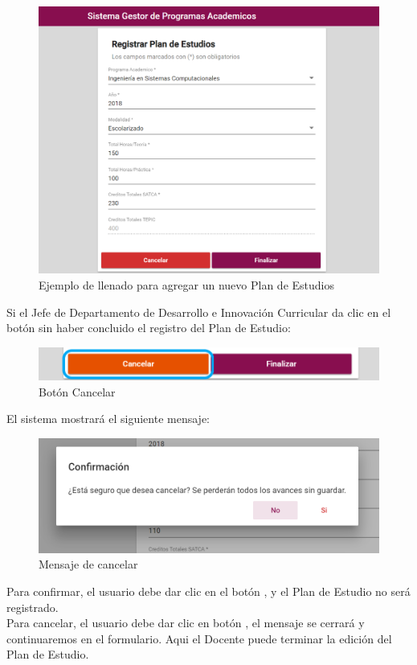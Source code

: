 \begin{figure}[!hbtp]
	\centering
	\hypertarget{ejreg}{\includegraphics[width=0.7\linewidth]{images/SP4-GPE/registrarEjem}}
	\caption{Ejemplo de llenado para agregar un nuevo Plan de Estudios}
	\label{ejreg}
\end{figure}
Si el Jefe de Departamento de Desarrollo e Innovación Curricular da clic en el botón  sin haber concluido el registro del Plan de Estudio:

\begin{figure}[!hbtp]
	\centering
	\hypertarget{cancel2}{\includegraphics[width=0.7\linewidth]{images/SP4-GPE/cancelarPE}}
	\caption{Botón Cancelar}
	\label{cancel2}
\end{figure}
\newpage

El sistema mostrará el siguiente mensaje:
\begin{figure}[!hbtp]
	\centering
	\hypertarget{ms1}{\includegraphics[width=0.7\linewidth]{images/SP4-GPE/m1}}
	\caption{Mensaje de cancelar}
	\label{ms1}
\end{figure}

Para confirmar, el usuario debe dar clic en el botón  , y el Plan de Estudio no será registrado.\\

Para cancelar, el usuario debe dar clic en botón  , el mensaje se cerrará y continuaremos en el formulario. Aqui el Docente puede terminar la edición del Plan de Estudio.

